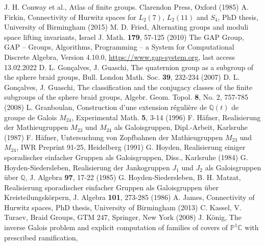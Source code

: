 \documentclass[12pt,a4paper]{article}
\numberwithin{equation}{section}
\numberwithin{table}{section}
\begin{document}
\begin{thebibliography}{}
J. H. Conway et al., Atlas of finite groups. Clarendon Press, Oxford (1985)
A. Firkin, Connectivity of Hurwitz spaces for $L_2(7)$, $L_2(11)$ and $S_4$, PhD thesis, University of Birmingham (2015)
M. D. Fried, Alternating groups and moduli space lifting invariants, Israel J. Math. \textbf{179}, 57-125 (2010)
The GAP Group, GAP -- Groups, Algorithms, Programming -- a System for Computational Discrete Algebra, Version 4.10.0,
\url{https://www.gap-system.org}, last access 13.02.2022
D. L. Gon\c{c}alves, J. Guaschi, The quaternion group as a subgroup of the sphere braid groups, Bull. London Math. Soc. \textbf{39}, 232-234 (2007)
D. L. Gon\c{c}alves, J. Guaschi, The classification and the conjugacy classes of the finite subgroups of the sphere braid groups,
Algebr. Geom. Topol. \textbf{8}, No. 2, 757-785 (2008)
L. Granboulan, Construction d'une extension r\'{e}guli\`{e}re de $\mathbb{Q}(t)$ de groupe de Galois $M_{24}$, Experimental Math. \textbf{5}, 3-14 (1996)
F. H\"afner, Realisierung der Mathieugruppen $M_{23}$ und $M_{24}$ als Galoisgruppen, Dipl.-Arbeit, Karlsruhe (1987)
F. H\"afner, Untersuchung von Zopfbahnen der Mathieugruppen $M_{23}$ und $M_{24}$, IWR Preprint 91-25, Heidelberg (1991)
G. Hoyden, Realisierung einiger sporadischer einfacher Gruppen als Galoisgruppen, Diss., Karlsruhe (1984)
G. Hoyden-Siedersleben, Realisierung der Jankogruppen $J_1$ und $J_2$ als Galoisgruppen \"uber $\mathbb{Q}$,
J. Algebra \textbf{97}, 17-22 (1985)
G. Hoyden-Siedersleben, B. H. Matzat, Realisierung sporadischer einfacher Gruppen als Galoisgruppen \"uber Kreisteilungsk\"orpern,
J. Algebra \textbf{101}, 273-285 (1986)
A. James, Connectivity of Hurwitz spaces, PhD thesis, University of Birmingham (2013)
C. Kassel, V. Turaev, Braid Groups, GTM 247, Springer, New York (2008)
J. K\"onig, The inverse Galois problem and explicit computation of families of covers of $\mathbb{P}^1\mathbb{C}$ with prescribed ramification, 

\end{thebibliography}
\end{document}
